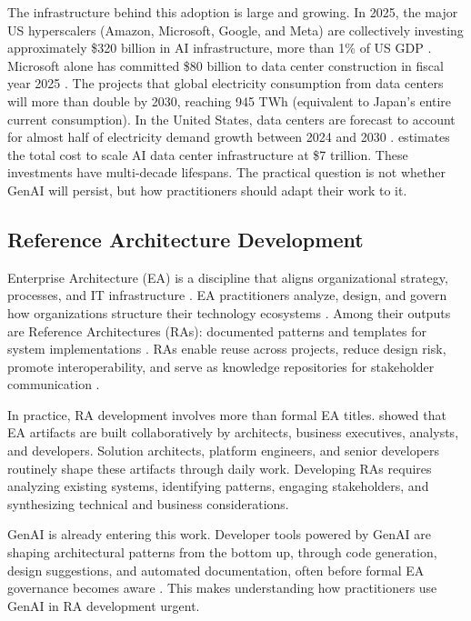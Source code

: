 The infrastructure behind this adoption is large and growing. In 2025, the major
US hyperscalers (Amazon, Microsoft, Google, and Meta) are collectively investing
approximately \$320 billion in AI infrastructure, more than 1\% of US GDP
\parencite{understanding_ai_2025}. Microsoft alone has committed \$80 billion to
data center construction in fiscal year 2025 \parencite{cnbc_tech_2025}. The
\textcite{iea_energy_2025} projects that global electricity consumption from
data centers will more than double by 2030, reaching 945 TWh (equivalent to
Japan's entire current consumption). In the United States, data centers are
forecast to account for almost half of electricity demand growth between 2024
and 2030 \parencite{iea_energy_2025}. \textcite{mckinsey_cost_2025} estimates
the total cost to scale AI data center infrastructure at \$7 trillion. These
investments have multi-decade lifespans. The practical question is not whether
GenAI will persist, but how practitioners should adapt their work to it.

\subsection{Reference Architecture Development}

Enterprise Architecture (EA) is a discipline that aligns organizational
strategy, processes, and IT infrastructure
\parencite{lankhorst_enterprise_2017}. EA practitioners analyze, design, and
govern how organizations structure their technology ecosystems
\parencite{the_open_group_togaf_2022}. Among their outputs are Reference
Architectures (RAs): documented patterns and templates for system
implementations \parencite{cloutier_concept_2010}. RAs enable reuse across
projects, reduce design risk, promote interoperability, and serve as knowledge
repositories for stakeholder communication
\parencite{cloutier_concept_2010, angelov_framework_2012}.

In practice, RA development involves more than formal EA titles.
\textcite{kotusev_enterprise_2018} showed that EA artifacts are built
collaboratively by architects, business executives, analysts, and developers.
Solution architects, platform engineers, and senior developers routinely shape
these artifacts through daily work. Developing RAs requires analyzing existing
systems, identifying patterns, engaging stakeholders, and synthesizing technical
and business considerations.

GenAI is already entering this work. Developer tools powered by GenAI are
shaping architectural patterns from the bottom up, through code generation,
design suggestions, and automated documentation, often before formal EA
governance becomes aware
\parencite{peng_impact_2023, tabarsi_llms_reshaping_se_2025}. This makes
understanding how practitioners use GenAI in RA development urgent.

